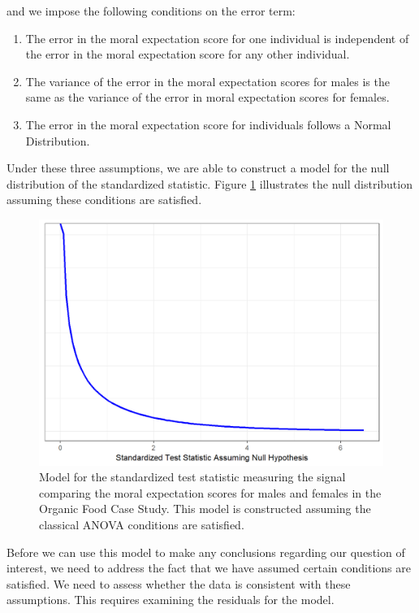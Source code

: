 \documentclass[]{book}
\providecommand{\tightlist}{%
  \setlength{\itemsep}{0pt}\setlength{\parskip}{0pt}}
\theoremstyle{plain}
\theoremstyle{mydefn}
\theoremstyle{myexmpl}
\theoremstyle{remark}
\begin{document}
and we impose the following conditions on the error term:

\begin{enumerate}
\def\labelenumi{\arabic{enumi}.}
\tightlist
\item
  The error in the moral expectation score for one individual is
  independent of the error in the moral expectation score for any other
  individual.
\item
  The variance of the error in the moral expectation scores for males is
  the same as the variance of the error in moral expectation scores for
  females.
\item
  The error in the moral expectation score for individuals follows a
  Normal Distribution.
\end{enumerate}

Under these three assumptions, we are able to construct a model for the
null distribution of the standardized statistic. Figure
\ref{fig:anovarecap-classical-null-model} illustrates the null
distribution assuming these conditions are satisfied.

\begin{figure}

{\centering \includegraphics[width=0.8\linewidth]{./Images/anovarecap-classical-null-model-1} 

}

\caption{Model for the standardized test statistic measuring the signal comparing the moral expectation scores for males and females in the Organic Food Case Study.  This model is constructed assuming the classical ANOVA conditions are satisfied.}\label{fig:anovarecap-classical-null-model}
\end{figure}

Before we can use this model to make any conclusions regarding our
question of interest, we need to address the fact that we have assumed
certain conditions are satisfied. We need to assess whether the data is
consistent with these assumptions. This requires examining the residuals
for the model.
\end{document}
